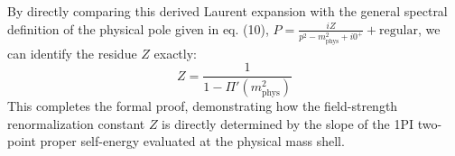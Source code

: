 By directly comparing this derived Laurent expansion with the general spectral definition of the physical pole given in eq. (10), $P = \frac{iZ}{p^2 - m_{\text{phys}}^2 + i0^+} + \text{regular}$, we can identify the residue $Z$ exactly:
\[
    Z = \frac{1}{1 - \Pi'(m_{\text{phys}}^2)}
\]
This completes the formal proof, demonstrating how the field-strength renormalization constant $Z$ is directly determined by the slope of the 1PI two-point proper self-energy evaluated at the physical mass shell.